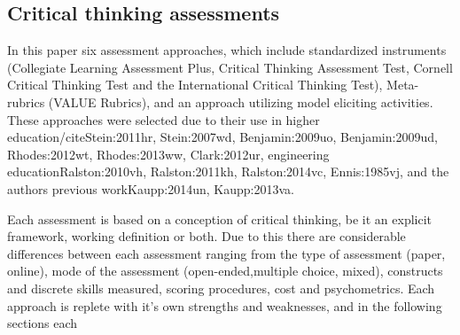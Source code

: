 \subsection{Critical thinking assessments}

In this paper six assessment approaches, which include standardized instruments (Collegiate Learning Assessment Plus, Critical Thinking Assessment Test, Cornell Critical Thinking Test and the International Critical Thinking Test), Meta-rubrics (VALUE Rubrics), and an approach utilizing model eliciting activities.  These approaches were selected due to their use in higher education/cite{Stein:2011hr, Stein:2007wd, Benjamin:2009uo, Benjamin:2009ud, Rhodes:2012wt, Rhodes:2013ww, Clark:2012ur}, engineering education{Ralston:2010vh, Ralston:2011kh, Ralston:2014vc, Ennis:1985vj}, and the authors previous work{Kaupp:2014un, Kaupp:2013va}.

Each assessment is based on a conception of critical thinking, be it an explicit framework, working definition or both.  Due to this there are considerable differences between each assessment ranging from the type of assessment (paper, online), mode of the assessment (open-ended,multiple choice, mixed), constructs and discrete skills measured, scoring procedures, cost and psychometrics.   Each approach is replete with it’s own strengths and weaknesses, and in the following sections each 
